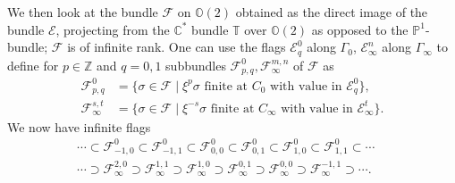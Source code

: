 \documentclass[12pt]{article}
\theoremstyle{definition}
\theoremstyle{remark}
\numberwithin{theorem}{section}
\def\bZ{{\mathbb {Z}}}
\def\bC{{\mathbb {C}}}
\def\bP{{\mathbb {P}}}
\def\bO{{\mathbb {O}}}
\def\bT{{\mathbb {T}}}
\def\pE{{\mathcal E}}
\def\pF{{\mathcal F}}
\begin{document}
We then look at  the bundle $\pF$ on $\bO(2)$ obtained as the direct image of the bundle $\pE$,  projecting from the $\bC^*$ bundle $\bT$ over $\bO(2)$ as opposed to the $\bP^1$-bundle; $\pF$ is of infinite rank. One   can use the
flags $\pE^0_q $ along $\Gamma_0$, $\pE_\infty^n$ along $\Gamma_\infty$
to define for $p\in \bZ$ and $q= 0,1$ subbundles $\pF^0_{p,q},
\pF_\infty^{m,n}$ of $\pF$ as
\begin{align*}
\pF^0_{ p,q} &=\{\sigma\in \pF\mid \xi^{p}\sigma\text{ finite at }{C}_0
                         \text{ with value in } \pE^0_q  \}, \\
\pF_\infty^{s,t} &=\{\sigma\in \pF\mid \xi^{-s}\sigma \text{ finite at } {C}_\infty
                           \text{ with value in } \pE_\infty^t \}.
\end{align*}
We now have infinite flags
\begin{equation}\label{infiniteflags}\begin{gathered}
\cdots\subset \pF^0_{-1,0}\subset \pF^0_{-1,1} \subset \pF^0_{0,0} \subset \pF^0_{0,1} \subset \pF^0_{1,0} \subset \pF^0_{1,1} \subset\cdots\phantom{-.}\\
\cdots\supset \pF_\infty^{2,0}\supset \pF_\infty^{1,1} \supset \pF_\infty^{1,0} \supset \pF_\infty^{0,1} \supset \pF_\infty^{0,0} \supset \pF_\infty^{-1,1} \supset\cdots.
\end{gathered}\end{equation}
\end{document}
